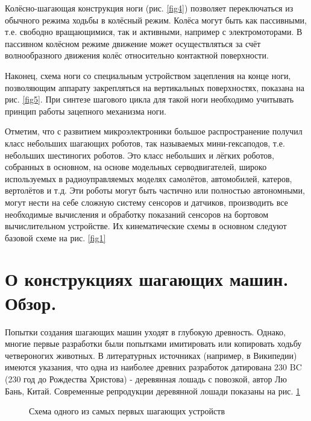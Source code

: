 Колёсно-шагающая конструкция ноги (рис. \ref{fig4}) позволяет переключаться из обычного режима ходьбы в колёсный режим. Колёса могут быть как пассивными, т.е. свободно вращающимися, так и активными, например с электромоторами. В пассивном колёсном режиме движение может осуществляться за счёт волнообразного движения колёс относительно контактной поверхности. 

Наконец, схема ноги со специальным устройством зацепления на конце ноги, позволяющим аппарату закрепляться на вертикальных поверхностях, показана на рис. \ref{fig5}. При синтезе шагового цикла для такой ноги необходимо учитывать принцип работы зацепного механизма ноги.

Отметим, что с развитием микроэлектроники большое распространение получил класс небольших шагающих роботов, так называемых мини-гексаподов, т.е. небольших шестиногих роботов. Это класс небольших и лёгких роботов, собранных в основном, на основе модельных серводвигателей, широко используемых в радиоуправляемых моделях самолётов, автомобилей, катеров, вертолётов и т.д. Эти роботы могут быть частично или полностью автономными, могут нести на себе сложную систему сенсоров и датчиков, производить все необходимые вычисления и обработку показаний сенсоров на бортовом вычислительном устройстве. Их кинематические схемы в основном следуют базовой схеме на рис. \ref{fig1}

\clearpage

\section*{О конструкциях шагающих машин. Обзор.}
Попытки создания шагающих машин уходят в глубокую древность. Однако, многие первые разработки были попытками имитировать или копировать ходьбу четвероногих животных. В литературных источниках (например, в Википедии) имеются указания, что одна из наиболее древних разработок датирована 230 BC (230 год до Рождества Христова) - деревянная лошадь с повозкой, автор Лю Бань, Китай. Современные репродукции деревянной лошади показаны на рис. \ref{fig6}

\begin{figure}[h]
\begin{minipage}{0.49\linewidth}
\end{minipage}
\hfill
\begin{minipage}{0.49\linewidth}
\end{minipage}
\caption{Схема одного из самых первых шагающих устройств}
\label{fig6}
\end{figure}

